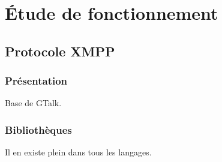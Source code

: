 \cleardoublepage



\chapter{Étude de fonctionnement}


\section{Protocole XMPP}


\subsection{Présentation}

Base de GTalk.
\\




\subsection{Bibliothèques}

Il en existe plein dans tous les langages.
\\





